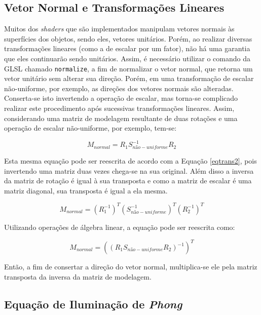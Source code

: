 	\subsection{Vetor Normal e Transformações Lineares}

	Muitos dos \textit{shaders} que são implementados manipulam vetores normais às superfícies dos objetos, sendo eles, vetores unitários. Porém, ao realizar diversas transformações lineares (como a de escalar por um fator), não há uma garantia que eles continuarão sendo unitários. Assim, é necessário utilizar o comando da GLSL chamado \texttt{normalize}, a fim de normalizar o vetor normal, que retorna um vetor unitário sem alterar sua direção. Porém, em uma transformação de escalar não-uniforme, por exemplo, as direções dos vetores normais são alteradas. Conserta-se isto invertendo a operação de escalar, mas torna-se complicado realizar este procedimento após sucessivas transformações lineares. Assim, considerando uma matriz de modelagem resultante de duas rotações e uma operação de escalar não-uniforme, por exemplo, tem-se:


	\begin{equation}
		M_ {normal} = R_ {1} S_ {não-uniforme}^{-1} R_ {2}
	\label{eqtrans1}
	\end{equation}

	Esta mesma equação pode ser reescrita de acordo com a Equação \ref{eqtrans2}, pois invertendo uma matriz duas vezes chega-se na sua original. Além disso a inversa da matriz de rotação é igual à sua transposta e como a matriz de escalar é uma matriz diagonal, sua transposta é igual a ela mesma.

	\begin{equation}
		M_ {normal} = (R_ {1}^{-1})^{T} (S_ {não-uniforme}^{-1})^{ T} (R_ {2}^{-1})^{T}
	\label{eqtrans2}
	\end{equation}

	Utilizando operações de álgebra linear, a equação pode ser reescrita como:

	\begin{equation}
		M_ {normal} = ((R_ {1} S_ {não-uniforme} R_ {2})^{-1})^{T}
	\label{eqtrans3}
	\end{equation}
	
	Então, a fim de consertar a direção do vetor normal, multiplica-se ele pela matriz transposta da inversa da matriz de modelagem.  

	\subsection{Equação de Iluminação de \textit{Phong}}
	\label{flatgouphon}

